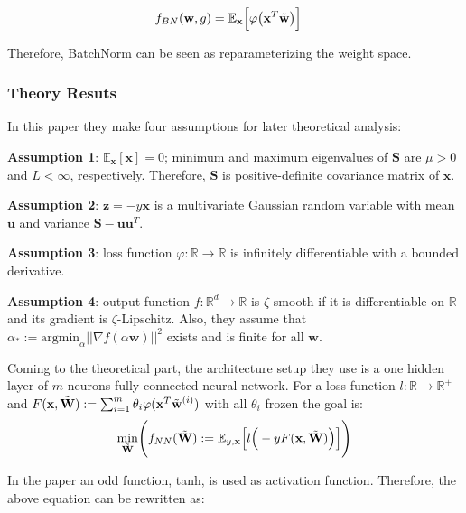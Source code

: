 \documentclass{article}
\begin{document}
\begin{align*}
    f_{BN}(\textbf{w},g)&=\mathbb{E}_{\textbf{x}}\Big[\varphi\big(\textbf{x}^T\Tilde{\textbf{w}}\big)\Big]
\end{align*}

Therefore, BatchNorm can be seen as reparameterizing the weight space.

\subsubsection{Theory Resuts}

In this paper they make four assumptions for later theoretical analysis:

\textbf{Assumption 1}: $\mathbb{E}_{\textbf{x}}[\textbf{x}]=0$; minimum and maximum eigenvalues of $\textbf{S}$ are $\mu>0$ and $L<\infty$, respectively. Therefore, $\textbf{S}$ is positive-definite covariance matrix of $\textbf{x}$.

\textbf{Assumption 2}: $\textbf{z}=-y\textbf{x}$ is a multivariate Gaussian random variable with mean $\textbf{u}$ and variance $\textbf{S}-\textbf{uu}^T$.

\textbf{Assumption 3}: loss function $\varphi:\mathbb{R}\rightarrow{}\mathbb{R}$ is infinitely differentiable with a bounded derivative.

\textbf{Assumption 4}: output function $f:\mathbb{R}^d\rightarrow{}\mathbb{R}$ is $\zeta$-smooth if it is differentiable on $\mathbb{R}$ and its gradient is $\zeta$-Lipschitz. Also, they assume that $\alpha_*:=\mathrm{argmin}_{\alpha}||\nabla f(\alpha\textbf{w})||^2$ exists and is finite for all $\textbf{w}$.

Coming to the theoretical part, the architecture setup they use is a one hidden layer of $m$ neurons fully-connected neural network. For a loss function $l:\mathbb{R}\rightarrow{}\mathbb{R}^+$ and $F(\textbf{x},\Tilde{\textbf{W}}):=\sum_{i=1}^m\theta_i\varphi(\textbf{x}^T\Tilde{\textbf{w}}^{(i)})$ with all $\theta_i$ frozen the goal is:\\

\begin{align*}
\underset{\Tilde{\textbf{W}}}{\min}\Bigg(f_{NN}(\Tilde{\textbf{W}}):=\mathbb{E}_{y,\textbf{x}}\Big[l\Big(-yF(\textbf{x},\Tilde{\textbf{W}})\Big)\Big]\Bigg)
\end{align*}

In the paper an odd function, tanh, is used as activation function. Therefore, the above equation can be rewritten as:
\end{document}
